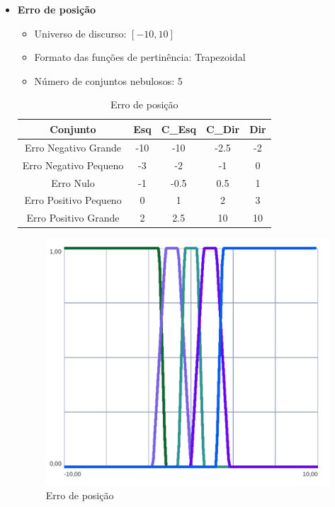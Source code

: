 \begin{itemize}
            \newpage    
        
        \item{\bf{Erro de posição}}
            \begin{itemize}
                \item Universo de discurso: $[-10,10]$
                \item Formato das funções de pertinência: Trapezoidal
                \item Número de conjuntos nebulosos: 5
            \end{itemize}

            \begin{table}[H]
                \centering
                \begin{tabular}{|c|c|c|c|c|}
                    \hline
                    Conjunto               & Esq   & C\_Esq & C\_Dir & Dir \\ \hline
                    Erro Negativo Grande   & -10   & -10   & -2.5  & -2    \\
                    Erro Negativo Pequeno  & -3    & -2    & -1    & 0     \\
                    Erro  Nulo             & -1    & -0.5  & 0.5   & 1     \\
                    Erro Positivo Pequeno  & 0     & 1     & 2     & 3     \\
                    Erro Positivo Grande   & 2     & 2.5   & 10    & 10    \\ \hline
                \end{tabular}
                \caption{Erro de posição}
            \end{table}

            \begin{figure}[H] 
                \centering
                \includegraphics[scale=0.7]{imagens/in_posicao.png}
                \caption{Erro de posição}
            \end{figure}


\end{itemize}
